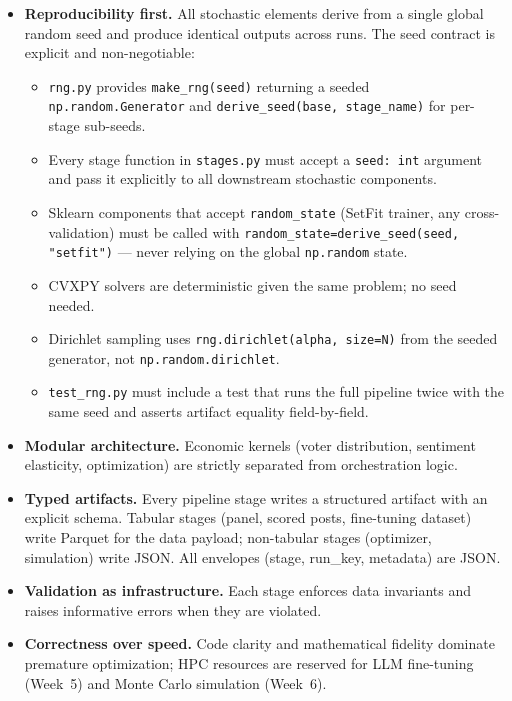 \documentclass[11pt]{article}
\begin{document}
\begin{itemize}[leftmargin=1.6em, itemsep=3pt]
  \item \textbf{Reproducibility first.} All stochastic elements derive from a single global
        random seed and produce identical outputs across runs. The seed contract is explicit
        and non-negotiable:
        \begin{itemize}[leftmargin=1.6em, itemsep=1pt]
          \item \texttt{rng.py} provides \texttt{make\_rng(seed)} returning a seeded
                \texttt{np.random.Generator} and \texttt{derive\_seed(base, stage\_name)}
                for per-stage sub-seeds.
          \item Every stage function in \texttt{stages.py} must accept a \texttt{seed: int}
                argument and pass it explicitly to all downstream stochastic components.
          \item Sklearn components that accept \texttt{random\_state} (SetFit trainer,
                any cross-validation) must be called with
                \texttt{random\_state=derive\_seed(seed, "setfit")} --- never relying on the
                global \texttt{np.random} state.
          \item CVXPY solvers are deterministic given the same problem; no seed needed.
          \item Dirichlet sampling uses \texttt{rng.dirichlet(alpha, size=N)} from the
                seeded generator, not \texttt{np.random.dirichlet}.
          \item \texttt{test\_rng.py} must include a test that runs the full pipeline twice
                with the same seed and asserts artifact equality field-by-field.
        \end{itemize}
  \item \textbf{Modular architecture.} Economic kernels (voter distribution, sentiment elasticity,
        optimization) are strictly separated from orchestration logic.
  \item \textbf{Typed artifacts.} Every pipeline stage writes a structured artifact with an
        explicit schema. Tabular stages (panel, scored posts, fine-tuning dataset) write
        Parquet for the data payload; non-tabular stages (optimizer, simulation) write JSON.
        All envelopes (stage, run\_key, metadata) are JSON.
  \item \textbf{Validation as infrastructure.} Each stage enforces data invariants and raises
        informative errors when they are violated.
  \item \textbf{Correctness over speed.} Code clarity and mathematical fidelity dominate premature
        optimization; HPC resources are reserved for LLM fine-tuning (Week~5) and Monte Carlo
        simulation (Week~6).
\end{itemize}
\end{document}
